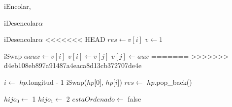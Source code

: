 \begin{Algoritmos}
\begin{algoritmo}{iEncolar}{, }{}
{\begin{algoritmo}{iDesencolar}{}{$\alpha$}
  \begin{algoritmo}{iDesencolar}{}{$\alpha$}
<<<<<<< HEAD
    $res \gets v[i]$ \;
     $v \gets 1$ \;
  \end{algoritmo}
  \datosAlgoritmo{} %
  {} %
  {} %
  {} %
  {} %

  \begin{algoritmo}{iSwap}{}
    $\alpha aux \gets v[i]$ \;
    $v[i] \gets v[j]$ \;
    $v[j] \gets aux$ \;
=======
>>>>>>> d4eb108eb897a91487a4eaca8d13cb372707de4e

     $i \gets$ $hp$.longitud - 1\;
    iSwap($hp$[$0$], $hp$[$i$])\; 
    $res \gets$ $hp$.pop\_back()\; 

     $hijo_{0} \gets$ 1\; 
     $hijo_{1} \gets$ 2\; 
     $estaOrdenado \gets$ false\; 


\end{algoritmo}
\end{algoritmo}}
\end{algoritmo}
\end{Algoritmos}
